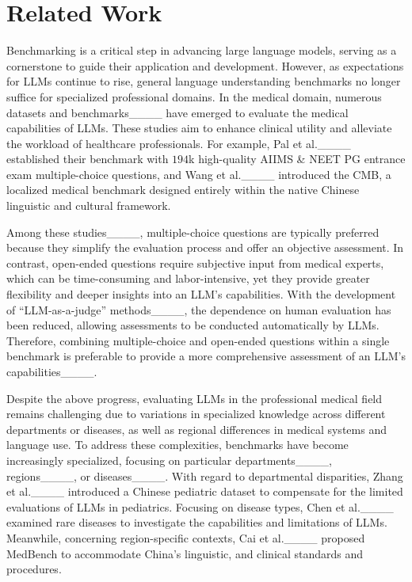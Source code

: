 \section{Related Work}
Benchmarking is a critical step in advancing large language models, serving as a cornerstone to guide their application and development. However, as expectations for LLMs continue to rise, general language understanding benchmarks no longer suffice for specialized professional domains.
In the medical domain, numerous datasets and benchmarks____ have emerged to evaluate the medical capabilities of LLMs. 
These studies aim to enhance clinical utility and alleviate the workload of healthcare professionals. 
For example, Pal et al.____ established their benchmark with $194$k high-quality AIIMS \& NEET PG entrance exam multiple-choice questions, and Wang et al.____ introduced the CMB, a localized medical benchmark designed entirely within the native Chinese linguistic and cultural framework.

Among these studies____, multiple-choice questions are typically preferred because they simplify the evaluation process and offer an objective assessment.
In contrast, open-ended questions require subjective input from medical experts, which can be time-consuming and labor-intensive, yet they provide greater flexibility and deeper insights into an LLM's capabilities.
With the development of ``LLM-as-a-judge'' methods____, the dependence on human evaluation has been reduced, allowing assessments to be conducted automatically by LLMs.
Therefore, combining multiple-choice and open-ended questions within a single benchmark is preferable to provide a more comprehensive assessment of an LLM's capabilities____. 

Despite the above progress, evaluating LLMs in the professional medical field remains challenging due to variations in specialized knowledge across different departments or diseases, as well as regional differences in medical systems and language use.
To address these complexities, benchmarks have become increasingly specialized, focusing on particular departments____, regions____, or diseases____.
With regard to departmental disparities, Zhang et al.____ introduced a Chinese pediatric dataset to compensate for the limited evaluations of LLMs in pediatrics.
Focusing on disease types, Chen et al.____ examined rare diseases to investigate the capabilities and limitations of LLMs.
Meanwhile, concerning region-specific contexts,  Cai et al.____ proposed MedBench to accommodate China's linguistic, and clinical standards and procedures. 

